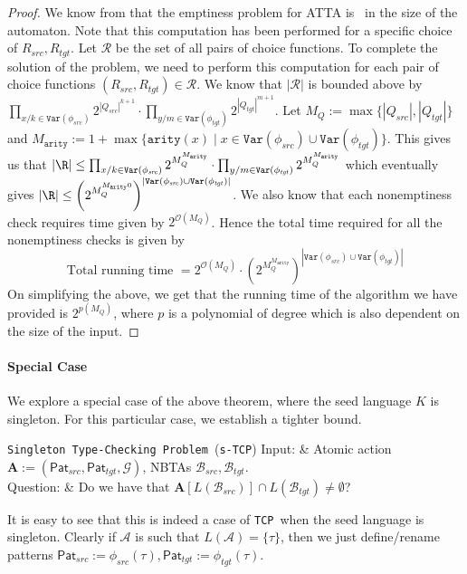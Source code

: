 \documentclass[12pt, a4paper]{article}
\newcommand{\typecheckingProblem}{\texttt{s-TCP}}
\newcommand{\metaTypecheckingProblem}{\texttt{TCP}}
\newcommand{\typecheckingProblemFull}{\texttt{Singleton Type-Checking Problem}}
\newcommand{\bigo}{\mathcal{O}}
\newcommand{\arity}{\texttt{arity}}
\newcommand{\Variables}{\texttt{Var}}
\newcommand{\pattern}{\mathsf{Pat}}
\newcommand{\action}{\ensuremath{\mathbf{A}}}
\newcommand{\automaton}{\ensuremath{\mathcal{A}}}
\newcommand{\automatonB}{\ensuremath{\mathcal{B}}}
\newcommand{\guardFunction}{\ensuremath{\mathcal{G}}}
\newcommand{\src}{\mathit{src}}
\newcommand{\sourcePattern}{\pattern_\src}
\newcommand{\sourceAutomatonB}{\ensuremath{\automatonB_{\src}}}
\newcommand{\sourceMap}{\ensuremath{\phi_{\src}}}
\newcommand{\tgt}{\mathit{tgt}}
\newcommand{\targetPattern}{\pattern_\tgt}
\newcommand{\targetAutomatonB}{\ensuremath{\automatonB_{\tgt}}}
\newcommand{\targetMap}{\ensuremath{\phi_{\tgt}}}
\newcommand{\probdef}[3]{
\begin{problem}[framed]{#1}
Input: & #2\\
Question: & #3
\end{problem}
}
\begin{document}
\begin{proof}
    We know from \cite{tata} that the emptiness problem for ATTA is \exptc\ in the size of the automaton. Note that this computation has been performed for a specific choice of $R_\src, R_\tgt$. Let $\mathcal{R}$ be the set of all pairs of choice functions. To complete the solution of the problem, we need to perform this computation for each pair of choice functions $(R_\src, R_\tgt) \in \mathcal{R}$. We know that $|\mathcal{R}|$ is bounded above by $\prod_{x/k \in \Variables(\sourceMap)}2^{|Q_\src|^{k+1}} \cdot \prod_{y/m \in \Variables(\targetMap)}2^{|Q_\tgt|^{m+1}}$. Let $M_Q := \max\{|Q_\src|, |Q_\tgt|\}$ and $M_\arity := 1+\max\{\arity(x) \mid x \in \Variables(\sourceMap) \cup \Variables(\targetMap)\}$. This gives us that $|\R| \leq \prod_{x/k \in \Variables(\sourceMap)}2^{M_Q^{M_\arity}} \cdot \prod_{y/m \in \Variables(\targetMap)}2^{M_Q^{M_\arity}}$ which eventually gives $|\R| \leq \left(2^{M_Q^{M_\arity0}}\right)^{|\Variables(\sourceMap) \cup \Variables(\targetMap)|}$. We also know that each nonemptiness check requires time given by $2^{\bigo(M_Q)}$. Hence the total time required for all the nonemptiness checks is given by
    \[ \mbox{Total running time } = 2^{\bigo(M_Q)} \cdot \left(2^{M_Q^{M_\arity}}\right)^{|\Variables(\sourceMap) \cup \Variables(\targetMap)|} \]
    On simplifying the above, we get that the running time of the algorithm we have provided is $2^{p(M_Q)}$, where $p$ is a polynomial of degree which is also dependent on the size of the input.
\end{proof}

\paragraph*{Special Case}

We explore a special case of the above theorem, where the seed language $K$ is singleton. For this particular case, we establish a tighter bound.

\probdef{\typecheckingProblemFull\ (\typecheckingProblem)}
{Atomic action $\action := (\sourcePattern, \targetPattern, \guardFunction)$, NBTAs $\sourceAutomatonB, \targetAutomatonB$.}
{Do we have that $\action[L(\sourceAutomatonB)] \cap L(\targetAutomatonB) \neq \emptyset$?}
It is easy to see that this is indeed a case of \metaTypecheckingProblem\ when the seed language is singleton. Clearly if $\automaton$ is such that $L(\automaton) = \{\tau\}$, then we just define/rename patterns $\pattern_\src := \sourceMap(\tau), \pattern_\tgt := \targetMap(\tau)$.
\end{document}
